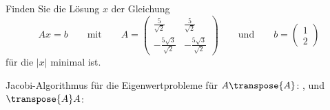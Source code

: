 Finden Sie die Lösung $x$ der Gleichung
\[
Ax
=
b
\qquad\text{mit}\qquad
A
=
\begin{pmatrix}
\frac{5}{\sqrt{2}}          & \frac{5}{\sqrt{2}}          \\
-\frac{5\sqrt{3}}{\sqrt{2}} & -\frac{5\sqrt{3}}{\sqrt{2}}
\end{pmatrix}
\qquad\text{und}\qquad
b
=
\begin{pmatrix}
1\\
2
\end{pmatrix}
\]
für die $|x|$ minimal ist.

\begin{hinweis}
Jacobi-Algorithmus für die Eigenwertprobleme für
$A\transpose{A}$:
,
und
$\transpose{A}A$:
\end{hinweis}


